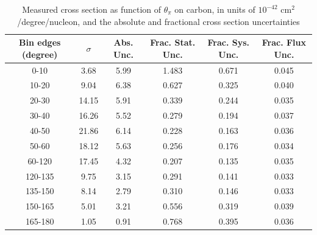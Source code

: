 \documentclass[../main.tex]{subfiles}
\begin{document}
\pagebreak
\begin{turnpage}
\end{turnpage}
\begin{table}
  \centering
  \renewcommand{\arraystretch}{1.15}
  \caption{Measured cross section as function of $\theta_{\pi}$ on carbon, in units of $10^{-42}$ $\text{cm}^2$/degree/nucleon, and the absolute and fractional cross section uncertainties}
    \begin{tabular}{c||c|c||c|c|c}
      Bin edges (degree) &  $\sigma$  &  Abs. Unc.  &  Frac. Stat. Unc.  &  Frac. Sys. Unc.  &  Frac. Flux Unc. \\
      \hline
      \hline
      0-10 & 3.68 & 5.99 & 1.483 & 0.671 & 0.045\\
      10-20 & 9.04 & 6.38 & 0.627 & 0.325 & 0.040\\
      20-30 & 14.15 & 5.91 & 0.339 & 0.244 & 0.035\\
      30-40 & 16.26 & 5.52 & 0.279 & 0.194 & 0.037\\
      40-50 & 21.86 & 6.14 & 0.228 & 0.163 & 0.036\\
      50-60 & 18.12 & 5.63 & 0.256 & 0.176 & 0.034\\
      60-120 & 17.45 & 4.32 & 0.207 & 0.135 & 0.035\\
      120-135 & 9.75 & 3.15 & 0.291 & 0.141 & 0.033\\
      135-150 & 8.14 & 2.79 & 0.310 & 0.146 & 0.033\\
      150-165 & 5.01 & 3.21 & 0.556 & 0.319 & 0.039\\
      165-180 & 1.05 & 0.91 & 0.768 & 0.395 & 0.036
    \end{tabular}
  \label{tbl:datanucleonnuc6pion_thetaa}
\end{table}
\pagebreak
\end{document}

